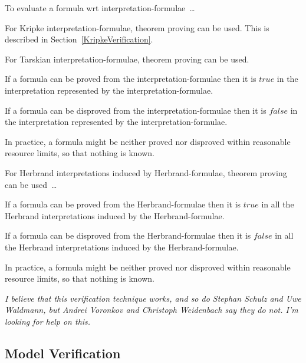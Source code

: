 \documentclass{easychair}
\newenvironment{packed_itemize}{
\vspace*{-0.3em}
\begin{itemize}
\setlength{\partopsep}{0pt}
\setlength{\itemsep}{1pt}
\setlength{\parskip}{0pt}
\setlength{\parsep}{0pt}
}{\end{itemize}}
\begin{document}
To evaluate a formula wrt interpretation-formulae~\ldots
\begin{packed_itemize}
\item For Kripke interpretation-formulae, theorem proving can be used.
      This is described in Section~\ref{KripkeVerification}.
\item For Tarskian interpretation-formulae, theorem proving can be used.
      \begin{packed_itemize}
      \item If a formula can be proved from the interpretation-formulae then it is $true$ in the 
            interpretation represented by the interpretation-formulae.
      \item If a formula can be disproved from the interpretation-formulae then it is $false$ in 
            the interpretation represented by the interpretation-formulae.
      \item In practice, a formula might be neither proved nor disproved within reasonable 
            resource limits, so that nothing is known.
      \end{packed_itemize}
\item For Herbrand interpretations induced by Herbrand-formulae, theorem proving can be used~\ldots
      \begin{packed_itemize}
      \item If a formula can be proved from the Herbrand-formulae then it is $true$ in all the 
            Herbrand interpretations induced by the Herbrand-formulae.
      \item If a formula can be disproved from the Herbrand-formulae then it is $false$ in all 
            the Herbrand interpretations induced by the Herbrand-formulae.
      \item In practice, a formula might be neither proved nor disproved within reasonable 
            resource limits, so that nothing is known.
      \end{packed_itemize}
      \emph{I believe that this verification technique works, and so do Stephan Schulz and 
      Uwe Waldmann, but Andrei Voronkov and Christoph Weidenbach say they do not.
      I'm looking for help on this.}
\end{packed_itemize}

\subsection{Model Verification}
\label{Verification}
\end{document}
